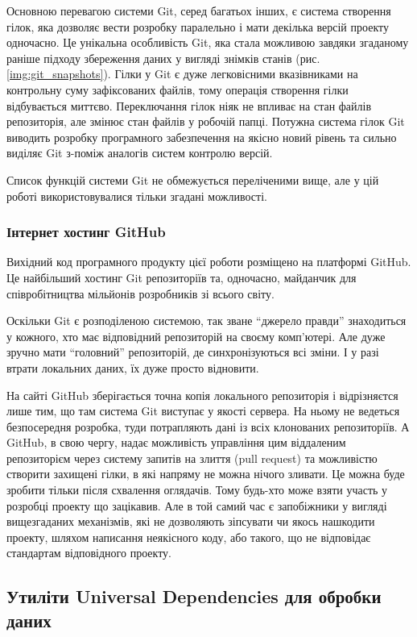 Основною перевагою системи Git, серед багатьох інших, є система створення гілок, яка
дозволяє вести розробку паралельно і мати декілька версій проекту одночасно. Це унікальна
особливість Git, яка стала можливою завдяки згаданому раніше підходу збереження даних
у вигляді знімків станів (рис. \ref{img:git_snapshots}). Гілки у Git є дуже легковісними
вказівниками на контрольну суму зафіксованих файлів, тому операція створення гілки
відбувається миттєво. Переключання гілок ніяк не впливає на стан файлів репозиторія,
але змінює стан файлів у робочій папці. Потужна система гілок Git виводить розробку
програмного забезпечення на якісно новий рівень та сильно виділяє Git з-поміж аналогів
систем контролю версій.

Список функцій системи Git не обмежується переліченими вище, але у цій роботі 
використовувалися тільки згадані можливості.

\subsubsection{Інтернет хостинг GitHub}
Вихідний код програмного продукту цієї роботи розміщено на платформі GitHub.
Це найбільший хостинг Git репозиторіїв та, одночасно, майданчик для співробітництва
мільйонів розробників зі всього світу.

Оскільки Git є розподіленою системою, так зване ``джерело правди'' знаходиться у кожного,
хто має відповідний репозиторій на своєму комп'ютері. Але дуже зручно мати ``головний''
репозиторій, де синхронізуються всі зміни. І у разі втрати локальних даних, їх дуже просто
відновити.

На сайті GitHub зберігається точна копія локального репозиторія і відрізняєтся лише тим,
що там система Git виступає у якості сервера. На ньому не ведеться безпосередня розробка,
туди потрапляють дані із всіх клонованих репозиторіїв. А GitHub, в свою чергу, надає
можливість управління цим віддаленим репозиторієм через систему запитів на злиття
(pull request) та можливістю створити захищені гілки, в які напряму не можна нічого
зливати. Це можна буде зробити тільки після схвалення оглядачів. Тому будь-хто може
взяти участь у розробці проекту що зацікавив. Але в той самий час є запобіжники у
вигляді вищезгаданих механізмів, які не дозволяють зіпсувати чи якось нашкодити
проекту, шляхом написання неякісного коду, або такого, що не відповідає стандартам
відповідного проекту.


\subsection{Утиліти Universal Dependencies для обробки даних}

